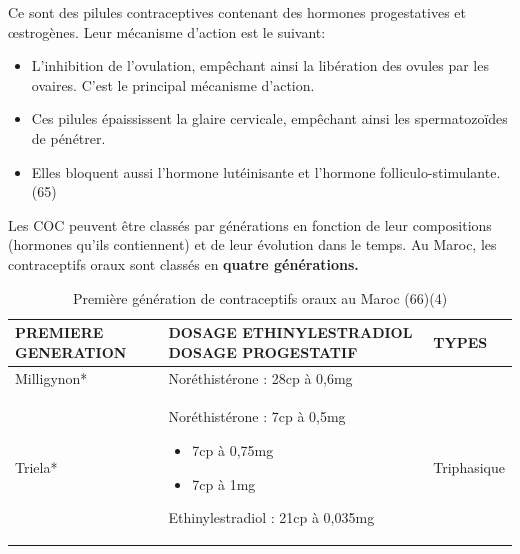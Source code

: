 Ce sont des pilules contraceptives contenant des hormones progestatives et œstrogènes. Leur mécanisme d’action est le suivant: 
\begin{itemize}[label={$\bullet$}, align=right]
  \item	L’inhibition de l’ovulation, empêchant ainsi la libération des ovules par les ovaires. C’est le principal mécanisme d’action. 
  \item Ces pilules épaississent la glaire cervicale, empêchant ainsi les spermatozoïdes de pénétrer. 
  \item	Elles bloquent aussi l’hormone lutéinisante et l’hormone folliculo-stimulante. (65)
\end{itemize}

\noindent Les COC peuvent être classés par générations en fonction de leur compositions (hormones qu’ils contiennent) et de leur évolution dans le temps. Au Maroc, les contraceptifs oraux sont classés en \textbf{quatre générations.}\vspace{2em}


\begin{table}[H]
    \centering
    \renewcommand{\arraystretch}{1.5}
    \begin{spacing}{1.5} %
    \begin{tabularx}{\textwidth}{|X|p{8cm}|X|}
        \hline
        \textbf{PREMIERE \newline GENERATION} & \textbf{DOSAGE ETHINYLESTRADIOL \newline DOSAGE PROGESTATIF} & \textbf{TYPES}  \\
        \hline
        Milligynon* & Noréthistérone : 28cp à 0,6mg  &  \\
        \hline
        Triela* & Noréthistérone : 7cp à 0,5mg 
       \begin{itemize}[label={}, nosep]
        \item \hspace{21mm}7cp à 0,75mg
        \item  \hspace{20mm} 7cp à 1mg
    \end{itemize}
Ethinylestradiol : 21cp à 0,035mg 
& Triphasique \\
        \hline
    \end{tabularx}
  \end{spacing}
    \caption{Première génération de contraceptifs oraux au Maroc (66)(4)}
\end{table}

